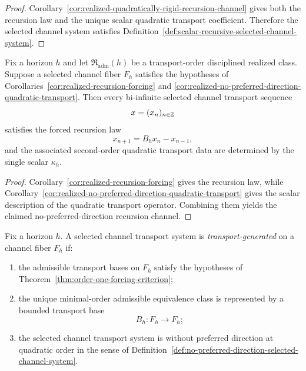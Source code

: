 \begin{proof}
Corollary~\ref{cor:realized-quadratically-rigid-recursion-channel} gives both
the recursion law and the unique scalar quadratic transport coefficient.
Therefore the selected channel system satisfies
Definition~\ref{def:scalar-recursive-selected-channel-system}.
\end{proof}

\begin{corollary}
\label{cor:realized-no-preferred-direction-recursion-channel}
Fix a horizon $h$ and let $\mathfrak R_{\mathrm{adm}}(h)$ be a transport-order
disciplined realized class. Suppose a selected channel fiber $F_h$ satisfies
the hypotheses of Corollaries~\ref{cor:realized-recursion-forcing} and
\ref{cor:realized-no-preferred-direction-quadratic-transport}. Then every
bi-infinite selected channel transport sequence
\[
x=(x_n)_{n\in\mathbb{Z}}
\]
satisfies the forced recursion law
\[
x_{n+1}=B_hx_n-x_{n-1},
\]
and the associated second-order quadratic transport data are determined by the
single scalar $\kappa_h$.
\end{corollary}

\begin{proof}
Corollary~\ref{cor:realized-recursion-forcing} gives the recursion law, while
Corollary~\ref{cor:realized-no-preferred-direction-quadratic-transport} gives
the scalar description of the quadratic transport operator. Combining them
yields the claimed no-preferred-direction recursion channel.
\end{proof}

\begin{definition}
\label{def:transport-generated-selected-channel-system}
Fix a horizon $h$. A selected channel transport system is
\emph{transport-generated} on a channel fiber $F_h$ if:
\begin{enumerate}[label=(\roman*), leftmargin=2em, itemsep=0.2em]
\item the admissible transport bases on $F_h$ satisfy the hypotheses of
      Theorem~\ref{thm:order-one-forcing-criterion};
\item the unique minimal-order admissible equivalence class is represented by a
      bounded transport base
      \[
      B_h:F_h\to F_h;
      \]
\item the selected channel transport system is without preferred direction at
      quadratic order in the sense of
      Definition~\ref{def:no-preferred-direction-selected-channel-system}.
\end{enumerate}
\end{definition}

